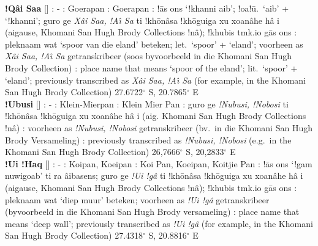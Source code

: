 \textbf{!Q\^{a}i Saa} [] : -
: Goerapan : Goerapan :
!\={a}s \textvertline{}ons `!khanni \textdoublebarpipe{}aib';
!oa!\={u}.\ `\textdoublebarpipe{}aib' + `!khanni';
\textdoublebarpipe{}guro ge \emph{\textdoublebarpipe{}X\^{a}i Saa,
!A\^{\i} Sa} ti !kh\={o}\textdoublevertline{}n\^{a}sa
!kh\={o}\textdoublevertline{}guiga xu xoa\textdoublevertline{}n\^{a}he
h\^{a} i (ai\textdoublevertline{}gause, \textdoublebarpipe{}Khomani
San Hugh Brody Collections !n\^{a}); !khubis tmk.io
\textdoublebarpipe{}g\={a}s \textvertline{}ons :
pleknaam wat `spoor van die eland' beteken; let.\ `spoor' + `eland';
voorheen as \emph{\textdoublebarpipe{}X\^{a}i Saa, !A\^{\i} Sa}
getranskribeer (soos byvoorbeeld in die \textdoublebarpipe{}Khomani
San Hugh Brody Collection) : place name that means
`spoor of the eland'; lit.\ `spoor' + `eland'; previously transcribed
as \emph{\textdoublebarpipe{}X\^{a}i Saa, !A\^{\i} Sa} (for example,
in the \textdoublebarpipe{}Khomani San Hugh Brody Collection)
27.6722$^{\circ}$ S, 20.7865$^{\circ}$ E \\

\textbf{!Ubusi} [] : - :
Klein-Mierpan : Klein Mier Pan :
\textdoublebarpipe{}guro ge \emph{!Nubusi, !Nobosi} ti
!kh\={o}\textdoublevertline{}n\^{a}sa
!kh\={o}\textdoublevertline{}guiga xu xoa\textdoublevertline{}n\^{a}he
h\^{a} i (ai\textdoublevertline{}g. \textdoublebarpipe{}Khomani San
Hugh Brody Collections !n\^{a}) : voorheen as
\emph{!Nubusi, !Nobosi} getranskribeer (bv.\ in die
\textdoublebarpipe{}Khomani San Hugh Brody Versameling)
: previously transcribed as \emph{!Nubusi, !Nobosi}
(e.g.\ in the \textdoublebarpipe{}Khomani San Hugh Brody Collection)
26,7666$^{\circ}$ S, 20,2833$^{\circ}$ E \\

\textbf{!Ui !Haq} [] : - : Koipan,
Koeipan : Koi Pan, Koeipan, Koitjie Pan :
!\={a}s \textvertline{}ons `!gam
\textdoublebarpipe{}nuwi\textdoublebarpipe{}goab' ti ra
\textdoublebarpipe{}\^{a}ibasens; \textdoublebarpipe{}guro ge
\emph{!Ui !g\^{a}} ti !kh\={o}\textdoublevertline{}n\^{a}sa
!kh\={o}\textdoublevertline{}guiga xu xoa\textdoublevertline{}n\^{a}he
h\^{a} i (ai\textdoublevertline{}gause, \textdoublebarpipe{}Khomani
San Hugh Brody Collections !n\^{a}); !khubis tmk.io
\textdoublebarpipe{}g\={a}s \textvertline{}ons :
pleknaam wat `diep muur' beteken; voorheen as \emph{!Ui !g\^{a}}
getranskribeer (byvoorbeeld in die \textdoublebarpipe{}Khomani San
Hugh Brody versameling) : place name that means `deep
wall'; previously transcribed as \emph{!Ui !g\^{a}} (for example, in
the \textdoublebarpipe{}Khomani San Hugh Brody Collection)
27.4318$^{\circ}$ S, 20.8816$^{\circ}$ E \\

